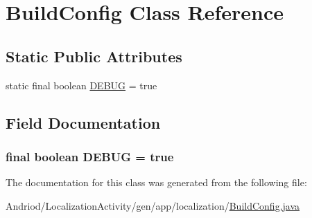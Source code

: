 \hypertarget{classapp_1_1localization_1_1_build_config}{\section{Build\-Config Class Reference}
\label{classapp_1_1localization_1_1_build_config}
}
\subsection*{Static Public Attributes}
\begin{DoxyCompactItemize}
\item 
static final boolean \hyperlink{classapp_1_1localization_1_1_build_config_a8270736aa6257cdc33f11a875840a05e}{D\-E\-B\-U\-G} = true
\end{DoxyCompactItemize}


\subsection{Field Documentation}
\hypertarget{classapp_1_1localization_1_1_build_config_a8270736aa6257cdc33f11a875840a05e}{
\subsubsection[{D\-E\-B\-U\-G}]{\setlength{\rightskip}{0pt plus 5cm}final boolean D\-E\-B\-U\-G = true\hspace{0.3cm}{\ttfamily [static]}}}\label{classapp_1_1localization_1_1_build_config_a8270736aa6257cdc33f11a875840a05e}


The documentation for this class was generated from the following file\-:\begin{DoxyCompactItemize}
\item 
Andriod/\-Localization\-Activity/gen/app/localization/\hyperlink{_localization_activity_2gen_2app_2localization_2_build_config_8java}{Build\-Config.\-java}\end{DoxyCompactItemize}
